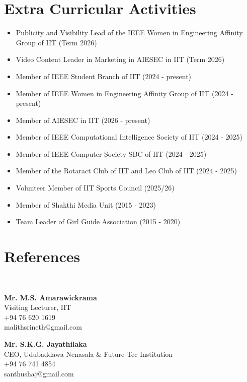 \documentclass[a4paper,10pt]{article}
\begin{document}
\section*{ Extra Curricular Activities}
\begin{itemize}
    \item  Publicity and Visibility Lead of the IEEE Women in Engineering Affinity Group of IIT (Term 2026)
    \item  Video Content Leader in Marketing in AIESEC in IIT (Term 2026)
    \item  Member of IEEE Student Branch of IIT (2024 - present)
    \item  Member of IEEE Women in Engineering Affinity Group of IIT  (2024 - present)
    \item  Member of AIESEC in IIT (2026 - present)
    \item  Member of IEEE Computational Intelligence Society of IIT (2024 - 2025)
    \item  Member of IEEE Computer Society SBC of IIT (2024 - 2025)
    \item Member of the Rotaract Club of IIT and Leo Club of IIT (2024 - 2025)
    \item Volunteer Member of IIT Sports Council (2025/26)
    \item Member of Shakthi Media Unit (2015 - 2023)
    \item Team Leader of Girl Guide Association (2015 - 2020)
\end{itemize}

\section*{ References}
\textit\\
\begin{minipage}[t]{0.48\textwidth} 
\textbf{Mr. M.S. Amarawickrama} \\[1mm]
Visiting Lecturer, IIT \\[1mm]
 +94 76 620 1619 \\[1mm]
 malithsrineth@gmail.com\\[1mm]
\end{minipage}
\hfill
\begin{minipage}[t]{0.48\textwidth}

\textbf{Mr. S.K.G. Jayathilaka} \\[1mm]
CEO, Udubaddawa Nenasala \&  Future Tec Institution 
\\[1mm]
 +94 76 741 4854 \\[1mm]
 santhushaj@gmail.com\\[1mm]
\end{minipage}
\end{document}
